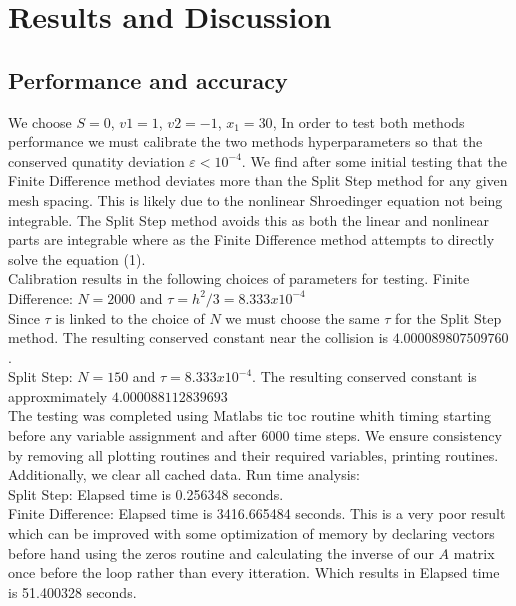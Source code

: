 \documentclass{article}
\begin{document}
\section{Results and Discussion}
\subsection{Performance and accuracy}
We choose $S=0$, $v1 = 1$, $v2 = -1$, $x_1 = 30$, 
In order to test both methods performance we must calibrate the two methods hyperparameters so that the conserved qunatity deviation $\varepsilon < 10^{-4}$. We find after some initial testing that the Finite Difference method deviates more than the Split Step method for any given mesh spacing. This is likely due to the nonlinear Shroedinger equation not being integrable. The Split Step method avoids this as both the linear and nonlinear parts are integrable where as the Finite Difference method attempts to directly solve the equation (1). \\
Calibration results in the following choices of parameters for testing. 
Finite Difference: $N=2000$ and $\tau = h^2/3 = 8.333x10^{-4}$ \\
Since $\tau$ is linked to the choice of $N$ we must choose the same $\tau$ for the Split Step method. The resulting conserved constant near the collision is $4.000089807509760$. \\
Split Step: $N=150$ and $\tau = 8.333x10^{-4}$. The resulting conserved constant is approxmimately $4.000088112839693$\\
The testing was completed using Matlabs tic toc routine whith timing starting before any variable assignment and after $6000$ time steps. 
We ensure consistency by removing all plotting routines and their required variables, printing routines. Additionally, we clear all cached data.
Run time analysis:\\
Split Step: Elapsed time is 0.256348 seconds.\\
Finite Difference:  Elapsed time is 3416.665484 seconds. This is a very poor result which can be improved with some optimization of memory by declaring vectors before hand using the zeros routine and calculating the inverse of our $A$ matrix once before the loop rather than every itteration. Which results in Elapsed time is 51.400328 seconds.
\end{document}
